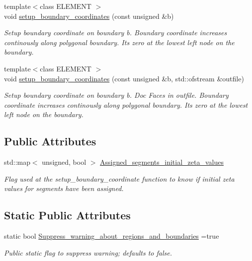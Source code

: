 \begin{DoxyCompactItemize}
{\footnotesize template$<$class E\+L\+E\+M\+E\+NT $>$ }\\void \hyperlink{classoomph_1_1UnstructuredTwoDMeshGeometryBase_a9edf47b5d621689f7c1d376b9c057ede}{setup\+\_\+boundary\+\_\+coordinates} (const unsigned \&b)
\begin{DoxyCompactList}\small\item\em Setup boundary coordinate on boundary b. Boundary coordinate increases continously along polygonal boundary. It\textquotesingle{}s zero at the lowest left node on the boundary. \end{DoxyCompactList}\item 
{\footnotesize template$<$class E\+L\+E\+M\+E\+NT $>$ }\\void \hyperlink{classoomph_1_1UnstructuredTwoDMeshGeometryBase_a133876ad6f2c50ca0325b1f8f49fb42d}{setup\+\_\+boundary\+\_\+coordinates} (const unsigned \&b, std\+::ofstream \&outfile)
\begin{DoxyCompactList}\small\item\em Setup boundary coordinate on boundary b. Doc Faces in outfile. Boundary coordinate increases continously along polygonal boundary. It\textquotesingle{}s zero at the lowest left node on the boundary. \end{DoxyCompactList}\end{DoxyCompactItemize}
\subsection*{Public Attributes}
\begin{DoxyCompactItemize}
\item 
std\+::map$<$ unsigned, bool $>$ \hyperlink{classoomph_1_1UnstructuredTwoDMeshGeometryBase_a218948f01cea679c910950782ba8ffde}{Assigned\+\_\+segments\+\_\+initial\+\_\+zeta\+\_\+values}
\begin{DoxyCompactList}\small\item\em Flag used at the setup\+\_\+boundary\+\_\+coordinate function to know if initial zeta values for segments have been assigned. \end{DoxyCompactList}\end{DoxyCompactItemize}
\subsection*{Static Public Attributes}
\begin{DoxyCompactItemize}
\item 
static bool \hyperlink{classoomph_1_1UnstructuredTwoDMeshGeometryBase_a1ae304480461c0dba53e7ce07e7ed21f}{Suppress\+\_\+warning\+\_\+about\+\_\+regions\+\_\+and\+\_\+boundaries} =true
\begin{DoxyCompactList}\small\item\em Public static flag to suppress warning; defaults to false. \end{DoxyCompactList}\end{DoxyCompactItemize}
